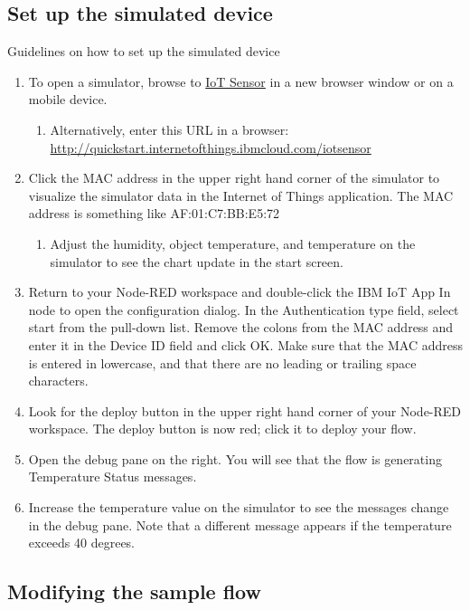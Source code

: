 \documentclass[]{book}
\begin{document}
\subsection{Set up the simulated device}
Guidelines on how to set up the simulated device

\begin{enumerate}


\item To open a simulator, browse to \href{https://quickstart.internetofthings.ibmcloud.com/iotsensor/}{IoT Sensor} in a new browser window or on a mobile device.

\begin{enumerate}
\item 	Alternatively, enter this URL in a browser: \url{http://quickstart.internetofthings.ibmcloud.com/iotsensor}
\end{enumerate}
\item Click the MAC address in the upper right hand corner of the simulator to visualize the simulator data in the Internet of Things application. The MAC address is something like AF:01:C7:BB:E5:72
\begin{enumerate}
\item 	Adjust the humidity, object temperature, and temperature on the simulator to see the chart update in the start screen.
\end{enumerate}
\item Return to your Node-RED workspace and double-click the IBM IoT App In node to open the configuration dialog. In the Authentication type field, select start from the pull-down list. Remove the colons from the MAC address and enter it in the Device ID field and click OK. Make sure that the MAC address is entered in lowercase, and that there are no leading or trailing space characters.
\item Look for the deploy button in the upper right hand corner of your Node-RED workspace. The deploy button is now red; click it to deploy your flow.
\item Open the debug pane on the right. You will see that the flow is generating Temperature Status messages.
\item Increase the temperature value on the simulator to see the messages change in the debug pane. Note that a different message appears if the temperature exceeds 40 degrees.

\end{enumerate}

\subsection{Modifying the sample flow}
\end{document}
